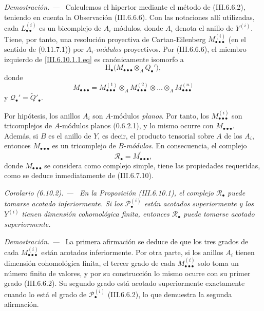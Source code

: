 \documentclass[10pt,oneside]{book}
\newcommand{\sh}[1]{\mathscr{#1}}
\newcommand{\HH}{\mathrm H}
\newcommand{\sref}[2][]{\textup{(#2)}}
\newcommand{\oldpage}[2][]{\setcounter{footnote}{0}\marginpar{\scriptsize\textbf{#1}~|~#2}\ignorespaces}
\newenvironment{corollary}[1][]{\par\medskip\noindent\itshape Corolario (#1). ---\ }{\par}
\newenvironment{proof}{\par\medskip\noindent\textit{Demostración. ---\ }}{\par}
\begin{document}
\begin{proof}
\oldpage[III]{172}
Calculemos el hipertor mediante el método de \sref{III.6.6.2},
teniendo en cuenta la Observación \sref{III.6.6.6}. Con las
notaciones allí utilizadas, cada $L_{\bullet\bullet}^{(i)}$ es un
bicomplejo de $A_i$-módulos, donde $A_i$ denota el anillo de
$Y^{(i)}$. Tiene, por tanto, una resolución proyectiva de
Cartan-Eilenberg $M_{\bullet\bullet\bullet}^{(i)}$ (en el sentido
de \sref[0]{0.11.7.1}) por $A_i$-\emph{módulos} proyectivos. Por
\sref{III.6.6.6}, el miembro izquierdo de
\eqref{III.6.10.1.1.eq} es canónicamente isomorfo a
\[
  \HH_\bullet
  \bigl(
    M_{\bullet\bullet\bullet}\otimes_AQ_\bullet'
  \bigr),
\]
donde
\[
  M_{\bullet\bullet\bullet}
  =
  M_{\bullet\bullet\bullet}^{(1)}
  \otimes_A
  M_{\bullet\bullet\bullet}^{(2)}
  \otimes\ldots\otimes_A
  M_{\bullet\bullet\bullet}^{(n)}
\]
y $\sh Q_\bullet'=\widetilde{Q}'_\bullet$.

Por hipótesis, los anillos $A_i$ son $A$-módulos \emph{planos}. Por
tanto, los $M_{\bullet\bullet\bullet}^{(i)}$ son tricomplejos de
$A$-módulos planos \sref[0]{0.6.2.1}, y lo mismo ocurre con
$M_{\bullet\bullet\bullet}$. Además, si $B$ es el anillo de $Y$,
es decir, el producto tensorial sobre $A$ de los $A_i$, entonces
$M_{\bullet\bullet\bullet}$ es un tricomplejo de $B$-\emph{módulos}.
En consecuencia, el complejo
\[
  \sh R_\bullet
  =
  \widetilde{M_{\bullet\bullet\bullet}},
\]
donde $M_{\bullet\bullet\bullet}$ se considera como complejo
simple, tiene las propiedades requeridas, como se deduce
inmediatamente de \sref{III.6.7.10}.
\end{proof}

\begin{corollary}[6.10.2]
\label{III.6.10.2}
En la Proposición \sref{III.6.10.1}, el complejo
$\sh R_\bullet$ puede tomarse acotado inferiormente. Si los
$\sh P_\bullet^{(i)}$ están acotados superiormente y los
$Y^{(i)}$ tienen dimensión cohomológica finita, entonces
$\sh R_\bullet$ puede tomarse acotado superiormente.
\end{corollary}

\begin{proof}
La primera afirmación se deduce de que los tres grados de cada
$M_{\bullet\bullet\bullet}^{(i)}$ están acotados inferiormente.
Por otra parte, si los anillos $A_i$ tienen dimensión
cohomológica finita, el tercer grado de cada
$M_{\bullet\bullet\bullet}^{(i)}$ solo toma un número finito de
valores, y por su construcción lo mismo ocurre con su primer grado
\sref{III.6.6.2}. Su segundo grado está acotado superiormente
exactamente cuando lo está el grado de $\sh P_\bullet^{(i)}$
\sref{III.6.6.2}, lo que demuestra la segunda afirmación.
\end{proof}
\end{document}

